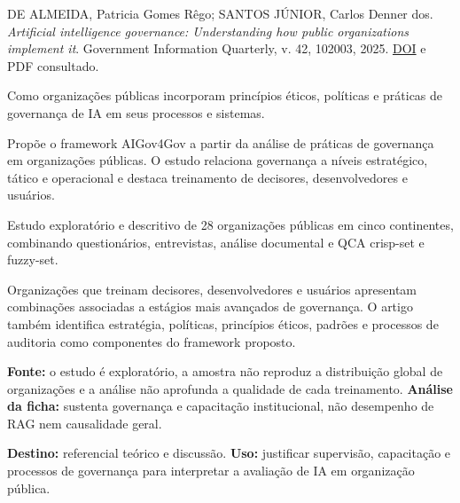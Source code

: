 {\small DE ALMEIDA, Patricia Gomes Rêgo; SANTOS JÚNIOR, Carlos Denner dos. \textit{Artificial intelligence governance: Understanding how public organizations implement it}. Government Information Quarterly, v. 42, 102003, 2025. \href{https://doi.org/10.1016/j.giq.2024.102003}{DOI} e PDF consultado.\par}

Como organizações públicas incorporam princípios éticos, políticas e práticas de governança de IA em seus processos e sistemas.

Propõe o framework AIGov4Gov a partir da análise de práticas de governança em organizações públicas. O estudo relaciona governança a níveis estratégico, tático e operacional e destaca treinamento de decisores, desenvolvedores e usuários.

Estudo exploratório e descritivo de 28 organizações públicas em cinco continentes, combinando questionários, entrevistas, análise documental e QCA crisp-set e fuzzy-set.

Organizações que treinam decisores, desenvolvedores e usuários apresentam combinações associadas a estágios mais avançados de governança. O artigo também identifica estratégia, políticas, princípios éticos, padrões e processos de auditoria como componentes do framework proposto.

\begin{itemize}
\end{itemize}

\textbf{Fonte:} o estudo é exploratório, a amostra não reproduz a distribuição global de organizações e a análise não aprofunda a qualidade de cada treinamento. \textbf{Análise da ficha:} sustenta governança e capacitação institucional, não desempenho de RAG nem causalidade geral.

\textbf{Destino:} referencial teórico e discussão. \textbf{Uso:} justificar supervisão, capacitação e processos de governança para interpretar a avaliação de IA em organização pública.


